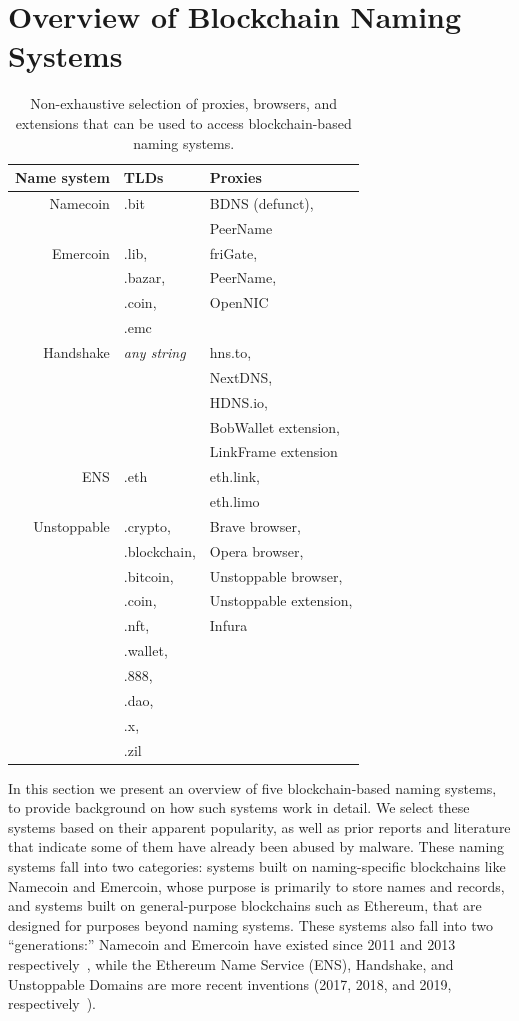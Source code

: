 \section{Overview of Blockchain Naming Systems}
\label{sec:naming_systems}

\begin{table}
	\begin{tabular}{r l l}
		\toprule
		Name system & TLDs & Proxies \\
		\midrule
		Namecoin & .bit & BDNS (defunct), \\
		& & PeerName \\
		Emercoin & .lib, &  friGate, \\
		& .bazar, &  PeerName,\\
		& .coin, & OpenNIC \\
		& .emc & \\
		Handshake & \emph{any string} & hns.to, \\
		& & NextDNS, \\
		& & HDNS.io,\\
		& & BobWallet extension, \\
		& & LinkFrame extension \\
		ENS & .eth & eth.link, \\
		& & eth.limo \\
		Unstoppable & .crypto, & Brave browser, \\
		& .blockchain, & Opera browser, \\
		& .bitcoin, & Unstoppable browser, \\
		& .coin, & Unstoppable extension, \\
		& .nft, & Infura\\
		& .wallet, & \\
		& .888, & \\
		& .dao, & \\
		& .x, & \\
		& .zil & \\
		\bottomrule
	\end{tabular}
	\caption{Non-exhaustive selection of proxies, browsers, 
		and extensions 
		that can be used to access blockchain-based naming 
		systems. }
	\label{tab:proxies_and_tlds}
\end{table}

In this section we present an overview of five blockchain-based naming 
systems, to provide background on how such systems work in detail. We select 
these systems based on their apparent popularity, as well as 
prior reports and literature that indicate some of them have already been 
abused by malware. These naming systems fall into two categories: systems built 
on naming-specific blockchains like Namecoin and Emercoin, whose purpose is 
primarily to store names and records, and systems built on general-purpose 
blockchains such as Ethereum, that are designed for purposes beyond naming 
systems. These systems also fall into two ``generations:'' Namecoin and 
Emercoin have existed since 2011 and 2013 
respectively~\cite{namecoin, emercoin}, while the Ethereum 
Name Service (ENS), Handshake, and Unstoppable 
Domains are more recent inventions (2017, 2018, and 2019, 
respectively~\cite{ens_website, handshake_website, 
first_ud_txn}). 

